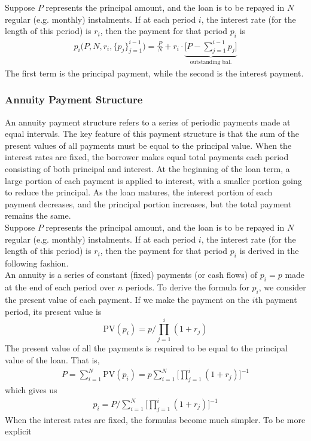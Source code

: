 \documentclass[11pt]{article}
\begin{document}
Suppose $P$ represents the principal amount, and the loan is to be repayed in $N$ regular (e.g. monthly) instalments. If at each period $i$, the interest rate (for the length of this period) is $r_i$, then the payment for that period $p_i$ is 
\begin{align}
	p_i\big(P,N,r_i,\{p_j\}_{j=1}^{i-1}\big)= \frac{P}{N}+r_i\cdot\underbrace{\bigg[P-\sum_{j=1}^{i-1}p_j\bigg]}_{\text{outstanding bal.}}
\end{align}
The first term is the principal payment, while the second is the interest payment.



\subsubsection{Annuity Payment Structure}

An annuity payment structure refers to a series of periodic payments made at equal intervals. The key feature of this payment structure is that the sum of the present values of all payments must be equal to the principal value. When the interest rates are fixed, the borrower makes equal total payments each period consisting of both principal and interest. At the beginning of the loan term, a large portion of each payment is applied to interest, with a smaller portion going to reduce the principal. As the loan matures, the interest portion of each payment decreases, and the principal portion increases, but the total payment remains the same.\\

Suppose $P$ represents the principal amount, and the loan is to be repayed in $N$ regular (e.g. monthly) instalments. If at each period $i$, the interest rate (for the length of this period) is $r_i$, then the payment for that period $p_i$ is derived in the following fashion.\\

An annuity is a series of constant (fixed) payments (or cash flows) of $p_i=p$ made at the end of each period over $n$ periods. To derive the formula for $p_i$, we consider the present value of each payment. If we make the payment on the $i$th payment period, its present value is 
$$\text{PV}(p_i)=p\bigg/\prod_{j=1}^i(1+r_j)$$
The present value of all the payments is required to be equal to the principal value of the loan. That is,
\begin{align}
	P=\sum_{i=1}^N\text{PV}(p_i)=p\sum_{i=1}^N\bigg[\prod_{j=1}^i(1+r_j)\bigg]^{-1}\nonumber
\end{align}
which gives us 
\begin{align}
	p_i=P\bigg/\sum_{i=1}^N\bigg[\prod_{j=1}^i(1+r_j)\bigg]^{-1}\label{annuity_der}
\end{align}
When the interest rates are fixed, the formulas become much simpler. To be more explicit
\end{document}
